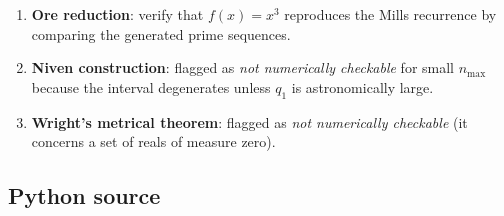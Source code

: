 \documentclass[11pt,reqno]{amsart}
\theoremstyle{redplain}
\numberwithin{equation}{section}
\begin{document}
\begin{enumerate}
\item \textbf{Ore reduction}: verify that $f(x)=x^3$ reproduces the Mills
recurrence by comparing the generated prime sequences.

\item \textbf{Niven construction}: flagged as \emph{not numerically checkable%
} for small $n_{\max}$ because the interval degenerates unless $q_1$ is
astronomically large.

\item \textbf{Wright's metrical theorem}: flagged as \emph{not numerically
checkable} (it concerns a set of reals of measure zero).
\end{enumerate}

\subsection{Python source}
\end{document}
